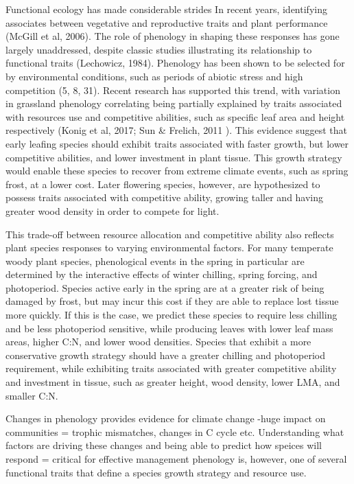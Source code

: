\documentclass{article}\usepackage[]{graphicx}\usepackage[]{color}
\begin{document}
\par Functional ecology has made considerable strides In recent years, identifying associates between vegetative and reproductive traits and plant performance (McGill et al, 2006).  The role of phenology in shaping these responses has gone largely unaddressed, despite classic studies illustrating its relationship to functional traits (Lechowicz, 1984). Phenology has been shown to be selected for by environmental conditions, such as periods of abiotic stress and high competition (5, 8, 31). Recent research has supported this trend, with variation in grassland phenology correlating being partially explained by traits associated with resources use and competitive abilities, such as specific leaf area and height respectively (Konig et al, 2017; Sun & Frelich, 2011 ). This evidence suggest that early leafing species should exhibit traits associated with faster growth, but lower competitive abilities, and lower investment in plant tissue. This growth strategy would enable these species to recover from extreme climate events, such as spring frost, at a lower cost. Later flowering species, however, are hypothesized to possess traits associated with competitive ability, growing taller and having greater wood density in order to compete for light. 

\par This trade-off between resource allocation and competitive ability also reflects plant species responses to varying environmental factors. For many temperate woody plant species, phenological events in the spring in particular are determined by the interactive effects of winter chilling, spring forcing, and photoperiod. Species active early in the spring are at a greater risk of being damaged by frost, but may incur this cost if they are able to replace lost tissue more quickly. If this is the case, we predict these species to require less chilling and be less photoperiod sensitive, while producing leaves with lower leaf mass areas, higher C:N, and lower wood densities. Species that exhibit a more conservative growth strategy should have a greater chilling and photoperiod requirement, while exhibiting traits associated with greater competitive ability and investment in tissue, such as greater height, wood density, lower LMA, and smaller C:N.


\par Changes in phenology provides evidence for climate change
-huge impact on communities = trophic mismatches, changes in C cycle etc.
Understanding what factors are driving these changes and being able to predict how speices will respond = critical for effective management
phenology is, however, one of several functional traits that define a species growth strategy and resource use.
\end{document}
